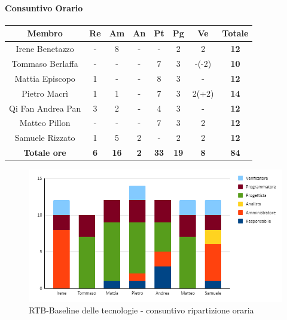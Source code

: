 \paragraph{Consuntivo Orario}
\begin{center}
	\renewcommand{\arraystretch}{1.8}
	\begin{tabular}{ |c|c|c|c|c|c|c|c| }
	\hline
	\textbf{Membro} & \textbf{Re} & \textbf{Am} &  \textbf{An} &  \textbf{Pt} &  \textbf{Pg} &  \textbf{Ve} &  \textbf{Totale}\\
    \hline
    Irene Benetazzo   & - & 8 & - & - & 2 & 2 & \textbf{12} \\
    \hline
    Tommaso Berlaffa  & - & - & - & 7 & 3 & -(-2) & \textbf{10} \\
    \hline
    Mattia Episcopo   & 1 & - & - & 8 & 3 & - & \textbf{12} \\
    \hline
    Pietro Macrì      & 1 & 1 & - & 7 & 3 & 2(+2) & \textbf{14} \\
    \hline
    Qi Fan Andrea Pan & 3 & 2 & - & 4 & 3 & - & \textbf{12} \\
    \hline
    Matteo Pillon     & - & - & - & 7 & 3 & 2 & \textbf{12} \\
    \hline
    Samuele Rizzato   & 1 & 5 & 2 & - & 2 & 2 & \textbf{12} \\
    \hline
    \textbf{Totale ore} & \textbf{6} & \textbf{16} &  \textbf{2} &  \textbf{33} &  \textbf{19} &  \textbf{8} &  \textbf{84}\\
    \hline
	\end{tabular}
\end{center}
\begin{figure}[H]
    \centering\includegraphics[width=\textwidth, height=\textheight,keepaspectratio]{images/consuntivo/RTB-tecnologico-ore.png}
    \caption{RTB-Baseline delle tecnologie - consuntivo ripartizione oraria}
\end{figure}

